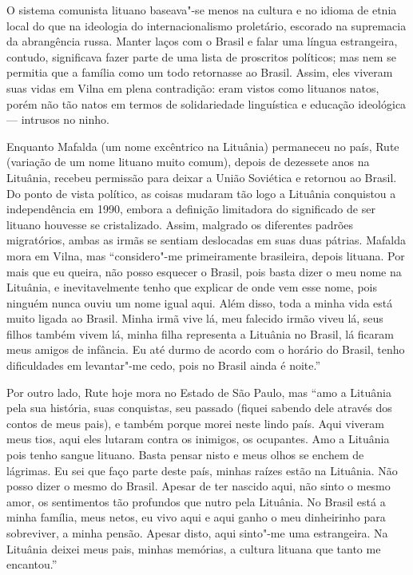 O sistema comunista lituano
baseava"-se menos na cultura e no idioma de etnia local do que na
ideologia do internacionalismo proletário, escorado na supremacia da
abrangência russa. Manter laços com o Brasil e falar uma língua
estrangeira, contudo, significava fazer parte de uma lista de proscritos
políticos; mas nem se permitia que a família como um todo retornasse ao
Brasil. Assim, eles viveram suas vidas em Vilna em plena contradição:
eram vistos como lituanos natos, porém não tão natos em termos de
solidariedade linguística e educação ideológica --- intrusos no ninho.

Enquanto Mafalda (um nome excêntrico na Lituânia) permaneceu no país, 
Rute (variação de um nome lituano muito comum), depois de
dezessete anos na Lituânia, recebeu permissão para deixar a União
Soviética e retornou ao Brasil. Do ponto de vista político, as coisas
mudaram tão logo a Lituânia conquistou a independência em 1990, embora a
definição limitadora do significado de ser lituano houvesse se
cristalizado. Assim, malgrado os diferentes padrões migratórios, ambas
as irmãs se sentiam deslocadas em suas duas pátrias. Mafalda mora em Vilna, mas
``considero"-me primeiramente brasileira, depois lituana. Por
mais que eu queira, não posso esquecer o Brasil, pois basta dizer o meu
nome na Lituânia, e inevitavelmente tenho que explicar de onde vem esse
nome, pois ninguém nunca ouviu um nome igual aqui. Além disso, toda a
minha vida está muito ligada ao Brasil. Minha irmã vive lá, meu falecido
irmão viveu lá, seus filhos também vivem lá, minha filha representa a
Lituânia no Brasil, lá ficaram meus amigos de infância. Eu até durmo de
acordo com o horário do Brasil, tenho dificuldades em levantar"-me cedo,
pois no Brasil ainda é noite.''

Por outro lado, Rute hoje mora no Estado de São Paulo, mas ``amo a Lituânia pela sua história, suas conquistas,
seu passado (fiquei sabendo dele através dos contos de meus pais), e
também porque morei neste lindo país. Aqui viveram meus tios, aqui eles
lutaram contra os inimigos, os ocupantes. Amo a Lituânia pois tenho
sangue lituano. Basta pensar nisto e meus olhos se enchem de lágrimas.
Eu sei que faço parte deste país, minhas raízes estão na Lituânia. Não
posso dizer o mesmo do Brasil. Apesar de ter nascido aqui, não sinto o
mesmo amor, os sentimentos tão profundos que nutro pela Lituânia. No
Brasil está a minha família, meus netos, eu vivo aqui e aqui ganho o meu
dinheirinho para sobreviver, a minha pensão. Apesar disto, aqui
sinto"-me uma estrangeira. Na Lituânia deixei meus pais, minhas memórias,
a cultura lituana que tanto me encantou.''

